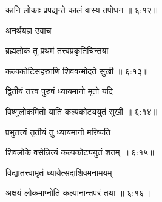 {\devanagarifont कानि लोकाः प्रपद्यन्ते कालं वास्य तपोधन {॥ ६:१२॥} \veg\dontdisplaylinenum }%

{\devanagarifont अनर्थयज्ञ उवाच {\dandab}\dontdisplaylinenum  }%
 
{\devanagarifont ब्रह्मलोकं तु प्रथमं तत्त्वप्रकृतिचिन्तया \thinspace{\danda} \dontdisplaylinenum }%


{\devanagarifont कल्पकोटिसहस्राणि शिववन्मोदते सुखी {॥ ६:१३॥} \veg\dontdisplaylinenum }%

{\devanagarifont द्वितीयं तत्त्व पुरुषं ध्यायमानो मृतो यदि \thinspace{\dandab} \dontdisplaylinenum }%
 

{\devanagarifont विष्णुलोकमितो याति कल्पकोट्ययुतं सुखी {॥ ६:१४॥} \veg\dontdisplaylinenum }%

{\devanagarifont प्रभुतत्त्वं तृतीयं तु ध्यायमानो मरिष्यति \thinspace{\dandab} \dontdisplaylinenum }%


{\devanagarifont शिवलोके वसेन्नित्यं कल्पकोट्ययुतं शतम् {॥ ६:१५॥} \veg\dontdisplaylinenum }%

{\devanagarifont विद्यातत्त्वामृतं ध्यायेत्सदाशिवमनामयम् \thinspace{\dandab} \dontdisplaylinenum }%


{\devanagarifont अक्षयं लोकमाप्नोति कल्पानान्तपरं तथा {॥ ६:१६॥} \veg\dontdisplaylinenum  }%

